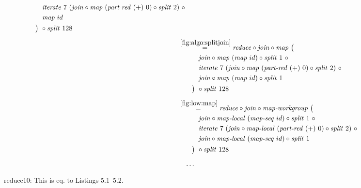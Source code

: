 \begin{figure*}[t]
\begin{align*}
\begin{aligned}
    &\qquad\quad\iterateN\ 7\ (\join \circ \map\ (\partRed\ (+)\ 0) \circ \splitN\ 2)\ \circ\\
    &\qquad\quad\map\ id\\
    &\qquad\big)\ \circ \splitN\ 128
  \end{aligned}\\[.5em]
%
  &\hspace{-2em}\quad\begin{aligned}
    &\overset{\ref{fig:algo:splitjoin}}{=\hspace{.2em}}
      \reduce \circ \join \circ \map\ \big(\\
    &\qquad\quad\join \circ \map\ (\map\ id) \circ \splitN\ 1\ \circ\\
    &\qquad\quad\iterateN\ 7\ (\join \circ \map\ (\partRed\ (+)\ 0) \circ \splitN\ 2)\ \circ\\
    &\qquad\quad\join \circ \map\ (\map\ id) \circ \splitN\ 1\\
    &\qquad\big)\ \circ \splitN\ 128
  \end{aligned}\\[.5em]
%
  &\hspace{-2em}\quad\begin{aligned}
    &\overset{\ref{fig:low:map}}{=\hspace{.2em}}
      \reduce \circ \join \circ \mapWorkgroup\ \big(\\
    &\qquad\quad\join \circ \mapLocal\ (\mapSeq\ id) \circ \splitN\ 1\ \circ\\
    &\qquad\quad\iterateN\ 7\ (\join \circ \mapLocal\ (\partRed\ (+)\ 0) \circ \splitN\ 2)\ \circ\\
    &\qquad\quad\join \circ \mapLocal\ (\mapSeq\ id) \circ \splitN\ 1\\
    &\qquad\big)\ \circ \splitN\ 128
  \end{aligned}\\[.5em]
%
  &\ldots
\end{align*}
\caption{reduce10: This is eq. to Listings 5.1--5.2.}
\end{figure*}

